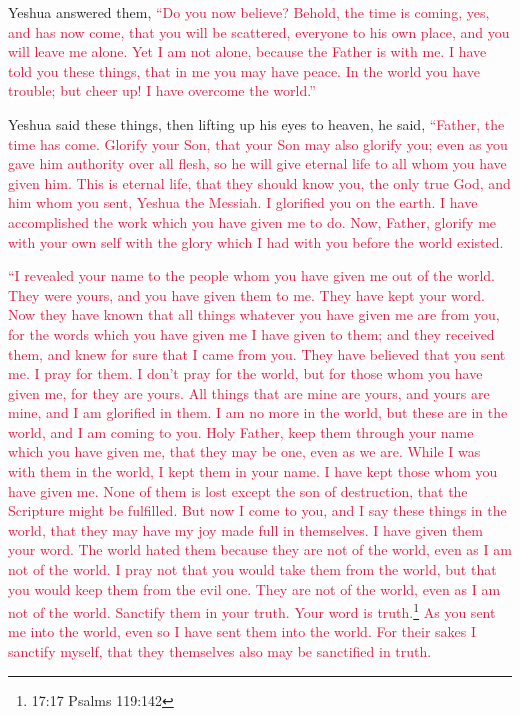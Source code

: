 \myverse{}Yeshua answered them,
\textcolor{crimson}{“Do you now believe?
}
\myverse{}\textcolor{crimson}{Behold, the time is coming, yes, and has now come, that you will be scattered,
	everyone to his own place, and you will leave me alone. Yet I am not alone, because the Father is with
	me.
}
\myverse{}\textcolor{crimson}{I have told you these things, that in me you may have peace. In the world
	you have trouble; but cheer up! I have overcome the world.”
}


\mychapter{} \myverse*{}Yeshua said these things, then lifting up his eyes to heaven,
he said,
\textcolor{crimson}{“Father, the time has come. Glorify your Son, that your Son may also glorify you;
}
\myverse{}\textcolor{crimson}{even as you gave him authority over all flesh, so he will give eternal
	life to all whom you have given him.
}
\myverse{}\textcolor{crimson}{This is eternal life, that they should know you, the only true God, and
	him whom you sent, Yeshua the Messiah.
}
\myverse{}\textcolor{crimson}{I glorified you on the earth. I have accomplished the work which you have
	given me to do.
}
\myverse{}\textcolor{crimson}{Now, Father, glorify me with your own self with the glory which I had with
	you before the world existed.
}

\myverse{}\textcolor{crimson}{“I revealed your name to the people whom you have given me
	out of the world. They were yours, and you have given them to me. They have kept your word.
}
\myverse{}\textcolor{crimson}{Now they have known that all things whatever you have given me are from
	you,
}
\myverse{}\textcolor{crimson}{for the words which you have given me I have given to them; and they received
	them, and knew for sure that I came from you. They have believed that you sent me.
}
\myverse{}\textcolor{crimson}{I pray for them. I don’t pray for the world, but for those whom you have
	given me, for they are yours.
}
\myverse{}\textcolor{crimson}{All things that are mine are yours, and yours are mine, and I am glorified
	in them.
}
\myverse{}\textcolor{crimson}{I am no more in the world, but these are in the world, and I am coming
	to you. Holy Father, keep them through your name which you have given me, that they may be one, even as
	we are.
}
\myverse{}\textcolor{crimson}{While I was with them in the world, I kept them in your name. I have
	kept those whom you have given me. None of them is lost except the son of destruction, that the Scripture
	might be fulfilled.
}
\myverse{}\textcolor{crimson}{But now I come to you, and I say these things in the world, that they
	may have my joy made full in themselves.
}
\myverse{}\textcolor{crimson}{I have given them your word. The world hated them because they are not
	of the world, even as I am not of the world.
}
\myverse{}\textcolor{crimson}{I pray not that you would take them from the world, but that you would
	keep them from the evil one.
}
\myverse{}\textcolor{crimson}{They are not of the world, even as I am not of the world.
}
\myverse{}\textcolor{crimson}{Sanctify them in your truth. Your word is truth.}\footnote{17:17 Psalms 119:142}
\myverse{}\textcolor{crimson}{As you sent me into the world, even so I have sent them into the world.
}
\myverse{}\textcolor{crimson}{For their sakes I sanctify myself, that they themselves also may be sanctified
	in truth.
}

